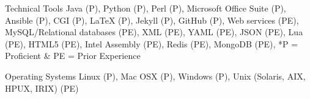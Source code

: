 


\begin{cvskills}


\cvskill
{Technical Tools} %
{Java (P), Python (P), Perl (P), Microsoft Office Suite (P), Ansible (P), CGI (P), LaTeX (P), Jekyll (P), GitHub (P), Web services (PE), MySQL/Relational databases (PE), XML (PE), YAML (PE), JSON (PE), Lua (PE),  HTML5 (PE), Intel Assembly (PE),  Redis (PE), MongoDB (PE), *P = Proficient \& PE = Prior Experience} %




\cvskill
{Operating Systems} %
{Linux (P), Mac OSX (P), Windows (P), Unix (Solaris, AIX, HPUX, IRIX) (PE)} %




\end{cvskills}